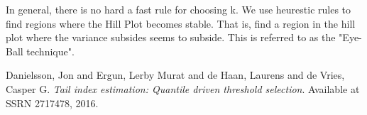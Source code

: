 \documentclass[letterpaper,12pt,titlepage,oneside,final]{book}
\begin{document}
In general, there is no hard a fast rule for choosing k. We use heurestic rules to find regions where the Hill Plot becomes stable. That is, find a region in the hill plot where the variance subsides seems to subside. This is referred to as the "Eye-Ball technique"\cite{danielsson2016tail}.
	



\begin{thebibliography}{9}
	Danielsson, Jon and Ergun, Lerby Murat and de Haan, Laurens and de Vries, Casper G. 
	\textit{Tail index estimation: Quantile driven threshold selection}. 
	Available at SSRN 2717478, 2016.
\end{thebibliography}


	
	
\end{document}
